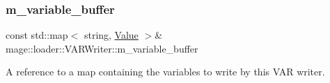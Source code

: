 \subsubsection{\texorpdfstring{m\+\_\+variable\+\_\+buffer}{m\_variable\_buffer}}
{\footnotesize\ttfamily const std\+::map$<$ string, \mbox{\hyperlink{namespacemage_a5bc219b33037a43e23f59e4e8ddff10d}{Value}} $>$\& mage\+::loader\+::\+V\+A\+R\+Writer\+::m\+\_\+variable\+\_\+buffer\hspace{0.3cm}{\ttfamily [private]}}

A reference to a map containing the variables to write by this V\+AR writer. 